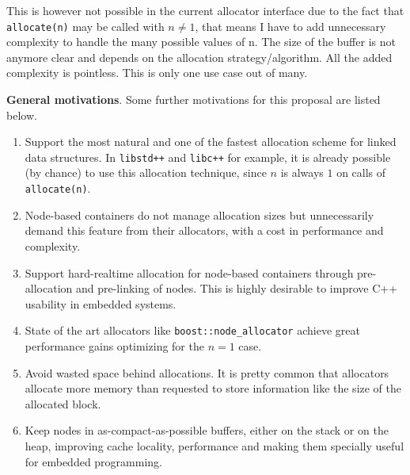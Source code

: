 \documentclass[11pt]{article}
\begin{document}
This is however not possible in the current allocator interface
due to the fact that \texttt{allocate(n)} may be called with $n \ne 1$,
that means I have to add unnecessary complexity to handle the many possible
values of n. The size of the buffer is not anymore clear and depends on the
allocation strategy/algorithm. All the added complexity is pointless. This is
only one use case out of many.

\medskip
\noindent
{\bf General motivations}. Some further motivations for this proposal are listed
below.
\begin{enumerate}

\item Support the most natural and one of the fastest allocation
scheme for linked data structures. In \texttt{libstd++} and
\texttt{libc++} for example, it is already possible (by chance) to use
this allocation technique, since $n$ is always $1$ on calls of
\texttt{allocate(n)}.

\item Node-based containers do not manage allocation sizes but
unnecessarily demand this feature from their allocators, with a cost
in performance and complexity.


\item Support hard-realtime allocation for node-based containers
through pre-allocation and pre-linking of nodes. This is highly
desirable to improve C++ usability in embedded systems.

\item State of the art allocators like \texttt{boost::node\_allocator}
\cite{boost} achieve great performance gains optimizing for the $n = 1$ case. 

\item Avoid wasted space behind allocations. It is pretty common that
allocators allocate more memory than requested to store information
like the size of the allocated block.

\item Keep nodes in as-compact-as-possible buffers, either on the
stack or on the heap, improving cache locality, performance and making
them specially useful for embedded programming.

\end{enumerate}
\end{document}
